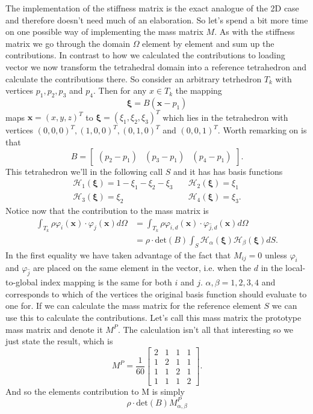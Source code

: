 \documentclass[paper=a4, fontsize=11pt]{scrartcl} %
\begin{document}
The implementation of the stiffness matrix is the exact analogue of the 2D case and therefore doesn't need much of an elaboration. So let's spend a bit more time on one possible way of implementing the mass matrix $M$. As with the stiffness matrix we go through the domain $\Omega$ element by element and sum up the contributions. In contrast to how we calculated the contributions to loading vector we now transform the tetrahedral domain into a reference tetrahedron and calculate the contributions there. So consider an arbitrary tetrhedron $T_k$ with vertices $p_1, p_2, p_3$ and $p_4$. Then for any $x\in T_k$ the mapping
\begin{equation*}
\boldsymbol{\xi} = B(\boldsymbol{x}-p_1)
\end{equation*}
maps $\boldsymbol{x}=(x,y,z)^T$ to $\boldsymbol{\xi}=(\xi_1,\xi_2,\xi_3)^T$ which lies in the tetrahedron with vertices $(0,0,0)^T,(1,0,0)^T,(0,1,0)^T$ and $(0,0,1)^T$. Worth remarking on is that
\begin{equation}
B = \begin{bmatrix}
(p_2 - p_1) & (p_3-p_1) & (p_4-p_1)
\end{bmatrix}.
\end{equation} This tetrahedron we'll in the following call $S$ and it has has basis functions
\begin{align*}
\mathcal{H}_1(\boldsymbol{\xi}) = 1-\xi_1-\xi_2 - \xi_3 &\quad \mathcal{H}_2(\boldsymbol{\xi}) = \xi_1 \\
\mathcal{H}_3(\boldsymbol{\xi}) = \xi_2 &\quad \mathcal{H}_4(\boldsymbol{\xi}) = \xi_3.
\end{align*}
Notice now that the contribution to the mass matrix is
\begin{align*}
\int_{T_k}\rho \varphi_i(\boldsymbol{x})\cdot \varphi_j(\boldsymbol{x})d\Omega &= \int_{T_k}\rho \varphi_{\hat{i},d}(\boldsymbol{x})\cdot \varphi_{\hat{j},d}(\boldsymbol{x})d\Omega \\
&= \rho\cdot \text{det}(B)\int_S\mathcal{H}_{\alpha}(\boldsymbol{\xi})\mathcal{H}_{\beta}(\boldsymbol{\xi})dS.
\end{align*}
In the first equality we have taken advantage of the fact that $M_{ij}=0$ unless $\varphi_{\hat{i}}$ and $\varphi_{\hat{j}}$ are placed on the same element in the vector, i.e. when the $d$ in the local-to-global index mapping is the same for both $i$ and $j$. $\alpha, \beta = 1,2,3,4$ and corresponds to which of the vertices the original basis function should evaluate to one for. If we can calculate the mass matrix for the reference element $S$ we can use this to calculate the contributions. Let's call this mass matrix the prototype mass matrix and denote it $M^P$. The calculation isn't all that interesting so we just state the result, which is
\begin{equation*}
M^P = \frac{1}{60}\begin{bmatrix}
2 & 1 & 1 & 1 \\
1 & 2 & 1 & 1 \\
1 & 1 & 2 & 1 \\
1 & 1 & 1 & 2
\end{bmatrix}.
\end{equation*}
And so the elements contribution to M is simply
\begin{equation*}
\rho\cdot \text{det}(B)M^P_{\alpha,\beta}
\end{equation*}
\end{document}
